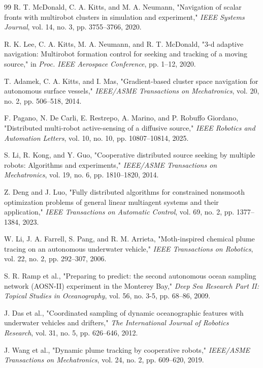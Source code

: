 \documentclass[lettersize,journal]{IEEEtran}
\begin{document}
\begin{thebibliography}{99}
 R. T. McDonald, C. A. Kitts, and M. A. Neumann, "Navigation of scalar fronts with multirobot clusters in simulation and experiment," \textit{IEEE Systems Journal}, vol. 14, no. 3, pp. 3755--3766, 2020.

 R. K. Lee, C. A. Kitts, M. A. Neumann, and R. T. McDonald, "3-d adaptive navigation: Multirobot formation control for seeking and tracking of a moving source," in \textit{Proc. IEEE Aerospace Conference}, pp. 1--12, 2020.

 T. Adamek, C. A. Kitts, and I. Mas, "Gradient-based cluster space navigation for autonomous surface vessels," \textit{IEEE/ASME Transactions on Mechatronics}, vol. 20, no. 2, pp. 506--518, 2014.

 F. Pagano, N. De Carli, E. Restrepo, A. Marino, and P. Robuffo Giordano, "Distributed multi-robot active-sensing of a diffusive source," \textit{IEEE Robotics and Automation Letters}, vol. 10, no. 10, pp. 10807--10814, 2025.

 S. Li, R. Kong, and Y. Guo, "Cooperative distributed source seeking by multiple robots: Algorithms and experiments," \textit{IEEE/ASME Transactions on Mechatronics}, vol. 19, no. 6, pp. 1810--1820, 2014.

 Z. Deng and J. Luo, "Fully distributed algorithms for constrained nonsmooth optimization problems of general linear multiagent systems and their application," \textit{IEEE Transactions on Automatic Control}, vol. 69, no. 2, pp. 1377--1384, 2023.

 W. Li, J. A. Farrell, S. Pang, and R. M. Arrieta, "Moth-inspired chemical plume tracing on an autonomous underwater vehicle," \textit{IEEE Transactions on Robotics}, vol. 22, no. 2, pp. 292--307, 2006.

 S. R. Ramp et al., "Preparing to predict: the second autonomous ocean sampling network (AOSN-II) experiment in the Monterey Bay," \textit{Deep Sea Research Part II: Topical Studies in Oceanography}, vol. 56, no. 3-5, pp. 68--86, 2009.

 J. Das et al., "Coordinated sampling of dynamic oceanographic features with underwater vehicles and drifters," \textit{The International Journal of Robotics Research}, vol. 31, no. 5, pp. 626--646, 2012.

 J. Wang et al., "Dynamic plume tracking by cooperative robots," \textit{IEEE/ASME Transactions on Mechatronics}, vol. 24, no. 2, pp. 609--620, 2019.


\end{thebibliography}
\end{document}
